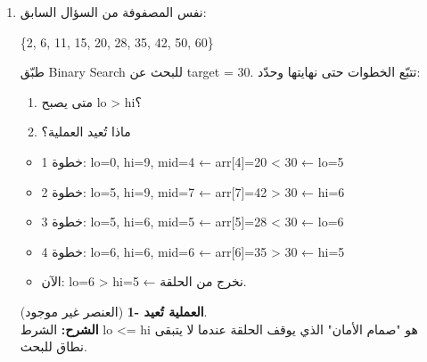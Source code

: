 \documentclass[14pt]{extarticle}
\begin{document}
\begin{enumerate}[itemsep=2em]
\begin{boxSolution}
\textbf{الشرح:}
\begin{itemize}[itemsep=1pt]
    \item خطوة 1: \textenglish{arr[4] = 20 < 28} ← \textenglish{lo = 5}
    \item خطوة 2: \textenglish{arr[7] = 42 > 28} ← \textenglish{hi = 6}
    \item خطوة 3: \textenglish{arr[5] = 28 == 28} ← وجدناه! نُعيد 5.
\end{itemize}
\end{boxSolution}
\clearpage
\fi

\item
نفس المصفوفة من السؤال السابق:

\begin{center}
\textenglish{\{2, 6, 11, 15, 20, 28, 35, 42, 50, 60\}}
\end{center}

طبّق \textenglish{Binary Search} للبحث عن \textenglish{target = 30}. تتبّع الخطوات حتى نهايتها وحدّد:
\begin{enumerate}
    \item متى يصبح \textenglish{lo > hi}؟
    \item ماذا تُعيد العملية؟
\end{enumerate}

\ifwithsols
\begin{boxSolution}
\begin{itemize}[itemsep=1pt]
    \item خطوة 1: \textenglish{lo=0, hi=9, mid=4} ← \textenglish{arr[4]=20 < 30} ← \textenglish{lo=5}
    \item خطوة 2: \textenglish{lo=5, hi=9, mid=7} ← \textenglish{arr[7]=42 > 30} ← \textenglish{hi=6}
    \item خطوة 3: \textenglish{lo=5, hi=6, mid=5} ← \textenglish{arr[5]=28 < 30} ← \textenglish{lo=6}
    \item خطوة 4: \textenglish{lo=6, hi=6, mid=6} ← \textenglish{arr[6]=35 > 30} ← \textenglish{hi=5}
    \item الآن: \textenglish{lo=6 > hi=5} ← نخرج من الحلقة.
\end{itemize}

\textbf{العملية تُعيد \textenglish{-1}} (العنصر غير موجود). \\
\textbf{الشرح:} الشرط \textenglish{lo <= hi} هو "صمام الأمان" الذي يوقف الحلقة عندما لا يتبقى نطاق للبحث.
\end{boxSolution}
\clearpage
\fi


\end{enumerate}
\end{document}
